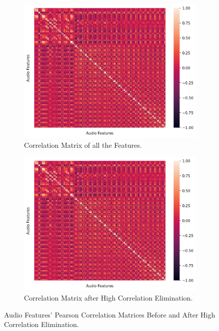 \begin{figure}
	\centering
	\begin{subfigure}{.5\textwidth}
		\centering
		\includegraphics[width=\linewidth]{figs/4_1_traditional/allCorrMatrix.png}
		\caption{Correlation Matrix of all the Features.}
		\label{fig:allAudioFeat}
	\end{subfigure}%
	\begin{subfigure}{.5\textwidth}
		\centering
		\includegraphics[width=\linewidth]{figs/4_1_traditional/highCorrMatrix.png}
		\caption{Correlation Matrix after High Correlation Elimination.}
		\label{fig:highAudioFeat}
	\end{subfigure}
	\caption{Audio Features' Pearson Correlation Matrices Before and After High Correlation Elimination.}
\end{figure}



